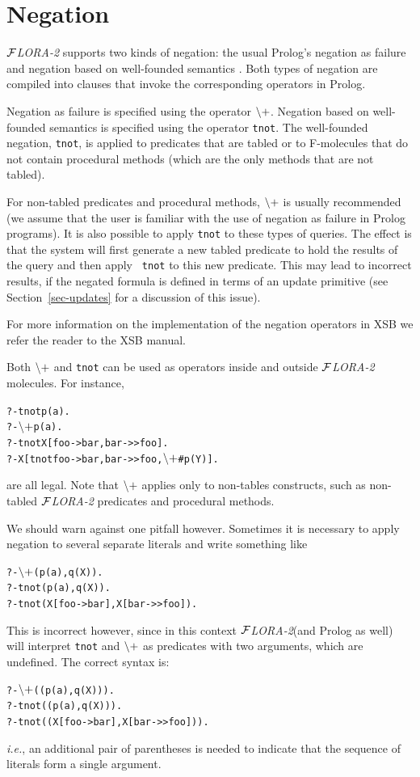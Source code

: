 \documentclass[11pt]{article}
\newcommand{\FLORA}{{\mbox{${\cal F}${\small\it LORA}\rm\emph{-2}}}\xspace}
\newcommand{\NAF}{{$\tt\backslash +$}\xspace}
\begin{document}
\section{Negation} \label{sec:negation}


\FLORA supports two kinds of negation: the usual Prolog's
negation as failure \cite{Cla78} and negation based on well-founded
semantics \cite{gelder-alternating-89,gelder-ross-schlipf-91}. Both types
of negation are compiled into clauses that invoke the corresponding
operators in Prolog.

\index{\NAF}
Negation as failure is specified using the operator \NAF.  Negation based
on well-founded semantics is specified using the operator {\tt tnot}. The
well-founded negation, {\tt tnot}, is applied to predicates that are tabled
or to F-molecules that do not contain procedural methods (which are the
only methods that are not tabled).

For non-tabled predicates and procedural methods, \NAF is usually
recommended (we assume that the user is familiar with the use of negation
as failure in Prolog programs).  It is also possible to apply {\tt tnot} to
these types of queries.  The effect is that the system will first generate
a new tabled predicate to hold the results of the query and then apply {\tt
  tnot} to this new predicate. This may lead to incorrect results,
if the negated formula is defined in terms of an update
primitive (see Section~\ref{sec-updates} for a discussion of this issue).

For more information on the implementation of the negation operators in XSB
we refer the reader to the XSB manual.

Both \NAF and {\tt tnot} can be used as operators inside and outside \FLORA
molecules. For instance,
\begin{alltt}
   ?- tnot p(a).
   ?- \NAF p(a).
   ?- tnot X[foo->bar, bar->>foo].
   ?- X[tnot foo->bar, bar->>foo, \NAF #p(Y)].
\end{alltt}
are all legal. Note that \NAF applies only to non-tables constructs, such
as non-tabled \FLORA predicates and procedural methods.

We should warn against one pitfall however. Sometimes it is necessary to
apply negation to several separate literals and write something like
\begin{alltt}
   ?- \NAF(p(a),q(X)).
   ?- tnot(p(a),q(X)).
   ?- tnot(X[foo->bar], X[bar->>foo]).
\end{alltt}
This is incorrect however, since in this context \FLORA (and Prolog as
well) will interpret {\tt tnot} and \NAF as predicates with two arguments,
which are undefined. The correct syntax is:
\begin{alltt}
   ?- \NAF((p(a),q(X))).
   ?- tnot((p(a),q(X))).
   ?- tnot((X[foo->bar], X[bar->>foo])).
\end{alltt}
{\it i.e.}, an additional pair of parentheses is needed to indicate that
the sequence of literals form a single argument.
\end{document}
